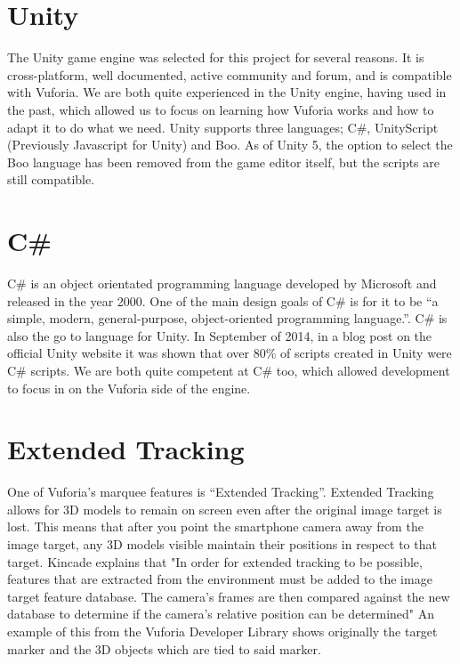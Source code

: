 \clearpage

\section{Unity}
The Unity game engine was selected for this project for several reasons. It is cross-platform, well documented, active community and forum, and is compatible with Vuforia. We are both quite experienced in the Unity engine, having used in the past, which allowed us to focus on learning how Vuforia works and how to adapt it to do what we need. Unity supports three languages; C\#, UnityScript (Previously Javascript for Unity) and Boo. As of Unity 5, the option to select the Boo language has been removed from the game editor itself, but the scripts are still compatible. 

\section{C\#}
C\# is an object orientated programming language developed by Microsoft and released in the year 2000. One of the main design goals of C\# is for it to be “a simple, modern, general-purpose, object-oriented programming language.”\cite{emca}. C\# is also the go to language for Unity. In September of 2014, in a blog post on the official Unity website\cite{unityLanguage} it was shown that over 80\% of scripts created in Unity were C\# scripts. We are both quite competent at C\# too, which allowed development to focus in on the Vuforia side of the engine.

\section{Extended Tracking}
One of Vuforia’s marquee features is “Extended Tracking”. Extended Tracking allows for 3D models to remain on screen even after the original image target is lost. This means that after you point the smartphone camera away from the image target, any 3D models visible maintain their positions in respect to that target. Kincade explains that "In order for extended tracking to be possible, features that are extracted from the environment must be added to the image target feature database. The camera’s frames are then compared against the new database to determine if the camera’s relative position can be determined"\cite{kincade}
An example of this from the Vuforia Developer Library\cite{vuforiaExtended} shows originally the target marker and the 3D objects which are tied to said marker.

